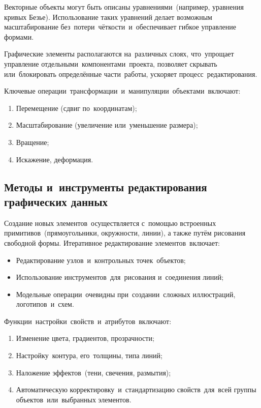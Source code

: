 \documentclass{ou}
\begin{document}
Векторные объекты могут быть описаны уравнениями~(например, уравнения кривых Безье). Использование таких уравнений делает возможным масштабирование без~потери~чёткости~и~обеспечивает гибкое управление формами.

Графические элементы располагаются на~различных слоях, что~упрощает управление отдельными~компонентами~проекта, позволяет скрывать или~блокировать определённые части~работы, ускоряет процесс~редактирования.

Ключевые операции~трансформации~и~манипуляции~объектами~включают:
\begin{enumerate}[leftmargin=0em, itemindent=3.75em, nosep, label=\arabic*)]
  \item Перемещение (сдвиг по~координатам);
  \item Масштабирование (увеличение или~уменьшение размера);
  \item Вращение;
  \item Искажение, деформация.
\end{enumerate}
\subsection{Методы и~инструменты редактирования графических данных}
Создание новых элементов~осуществляется с~помощью встроенных примитивов~(прямоугольники, окружности, линии), а также путём рисования свободной формы. Итеративное редактирование элементов~включает:
\begin{itemize}[label=-, leftmargin=0em, itemindent=3.35em, nosep]
  \item Редактирование узлов~и~контрольных точек~объектов;
  \item Использование инструментов~для~рисования и~соединения линий;
  \item Модельные операции~очевидны при~создании~сложных иллюстраций, логотипов~и~схем.
\end{itemize}

Функции~настройки~свойств~и~атрибутов~включают:
\begin{enumerate}[leftmargin=0em, itemindent=3.75em, nosep, label=\arabic*)]
  \item Изменение цвета, градиентов, прозрачности;
  \item Настройку~контура, его~толщины, типа линий;
  \item Наложение эффектов~(тени, свечения, размытия);
  \item Автоматическую корректировку~и~стандартизацию свойств~для~всей группы объектов~или~выбранных элементов.
\end{enumerate}
\end{document}
